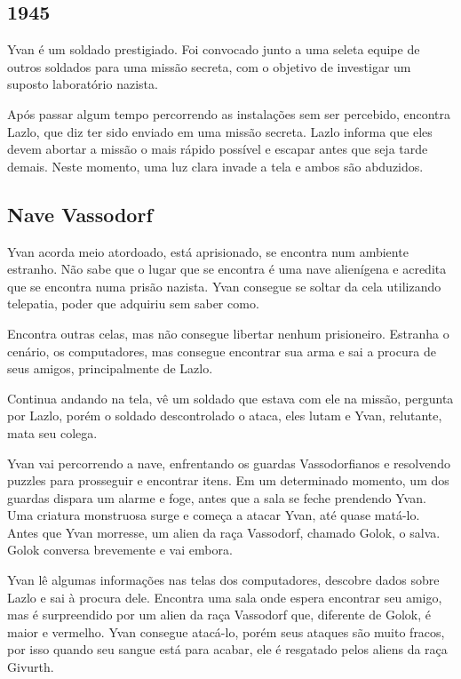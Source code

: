 \documentclass[12pt, a4paper]{article}
\begin{document}
	\subsection{1945}

	Yvan é um soldado prestigiado. Foi convocado junto
    a uma seleta equipe de outros soldados para uma missão secreta,
    com o objetivo de investigar um suposto laboratório nazista.

    Após passar algum tempo percorrendo as instalações sem 
    ser percebido, encontra Lazlo, que diz ter sido enviado 
    em uma missão secreta. Lazlo informa que eles devem abortar a missão
    o mais rápido possível e escapar antes que seja tarde demais.
    Neste momento, uma luz clara invade a tela e ambos são abduzidos.

	\subsection{Nave Vassodorf}

	Yvan acorda meio atordoado, está aprisionado, se encontra num 
    ambiente estranho. Não sabe que o lugar 
    que se encontra é uma nave alienígena e acredita que se encontra
    numa prisão nazista. Yvan consegue se soltar da
    cela utilizando telepatia, poder que adquiriu sem saber como.
    
    Encontra outras celas, mas não consegue libertar nenhum 
    prisioneiro. Estranha o cenário, os computadores, mas consegue
    encontrar sua arma e sai a procura de seus amigos, 
    principalmente de Lazlo.
    
    Continua andando na tela, vê um soldado que estava com ele na missão,
    pergunta por Lazlo, porém o soldado descontrolado o ataca, eles lutam
    e Yvan, relutante, mata seu colega.

    Yvan vai percorrendo a nave, enfrentando os guardas Vassodorfianos
    e resolvendo puzzles para prosseguir e encontrar itens.
    Em um determinado momento, um dos guardas dispara um alarme e foge,
    antes que a sala se feche prendendo Yvan.
    Uma criatura monstruosa surge e começa a atacar Yvan, até quase
    matá-lo. Antes que Yvan morresse, um alien da raça Vassodorf, chamado
    Golok, o salva. Golok conversa brevemente e vai embora.

    Yvan lê algumas informações nas telas dos computadores, descobre 
    dados sobre Lazlo e sai à procura dele.
    Encontra uma sala onde espera encontrar seu amigo,
    mas é surpreendido por um alien da raça Vassodorf que, 
    diferente de Golok, é maior e vermelho. Yvan consegue atacá-lo,
    porém seus ataques são muito fracos, por isso quando seu sangue está
    para acabar, ele é resgatado pelos aliens da raça Givurth.
\end{document}

